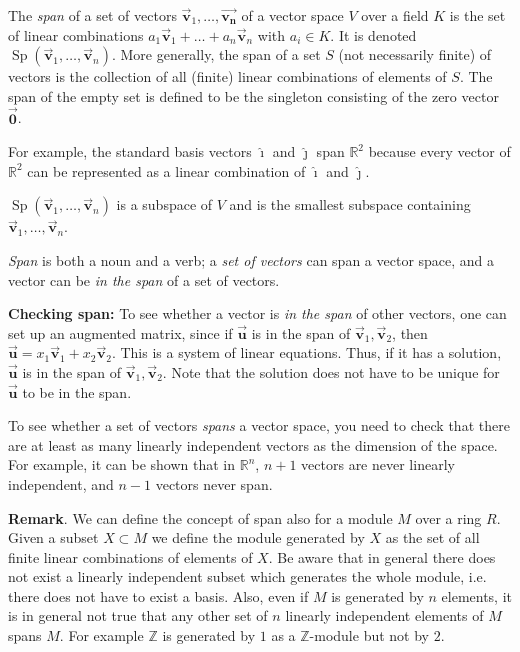\documentclass[12pt]{article}
\def\vec#1{\overrightarrow{\mathbf{#1}}}
\def\R{\mathbb{R}}
\def\Sp{\operatorname{Sp}}
\newcommand{\ZZ}{\mathbb{Z}}
\begin{document}
The \emph{span} of a set of vectors $\vec{v}_1,\dots,\vec{v_n}$ of a vector space $V$ over a field $K$ is the set of linear combinations $a_1\vec{v}_1+\dots+a_n\vec{v}_n$ with $a_i\in K$.  It is denoted $\Sp(\vec{v}_1,\dots,\vec{v}_n)$.   More generally, the span of a set $S$ (not necessarily finite) of vectors is the collection of all (finite) linear combinations of elements of $S$.  The span of the empty set is defined to be the singleton consisting of the zero vector $\vec{0}$.

For example, the standard basis vectors $\hat{\imath}$ and $\hat{\jmath}$ span $\R^2$ because every vector of $\R^2$ can be represented as a linear combination of $\hat{\imath}$ and $\hat{\jmath}$. 

$\Sp(\vec{v}_1,\dots,\vec{v}_n)$ is a subspace of $V$ and is the smallest subspace containing $\vec{v}_1,\dots,\vec{v}_n$.

\emph{Span} is both a noun and a verb; a \emph{set of vectors} can span a vector space, and a vector can be \emph{in the span} of a set of vectors.

\textbf{Checking span:} To see whether a vector is \emph{in the span} of other vectors, one can set up an augmented matrix, since if $\vec{u}$ is in the span of $\vec{v}_1,\vec{v}_2$, then $\vec{u} = x_1\vec{v}_1 + x_2\vec{v}_2$. This is a system of linear equations. Thus, if it has a solution, $\vec{u}$ is in the span of $\vec{v}_1,\vec{v}_2$. Note that the solution does not have to be unique for $\vec{u}$ to be in the span.

To see whether a set of vectors \emph{spans} a vector space, you need to check that there are at least as many linearly independent vectors as the dimension of the space. For example, it can be shown that in $\R^n$, $n+1$ vectors are never linearly independent, and $n-1$ vectors never span.

\textbf{Remark}.  We can define the concept of span also for a module $M$ over a ring $R$. 
Given a subset $X\subset M$ we define the module generated by $X$ as the set of all finite linear combinations of elements of $X$.
Be aware that in general there does not exist a linearly independent subset which generates the whole module, i.e. there does not have to exist a basis.
Also, even if $M$ is generated by $n$ elements, it is in general not true that any other set of $n$ linearly independent elements of $M$ spans $M$. 
For example $\ZZ$ is generated by $1$ as a $\ZZ$-module but not by $2$.

\end{document}
